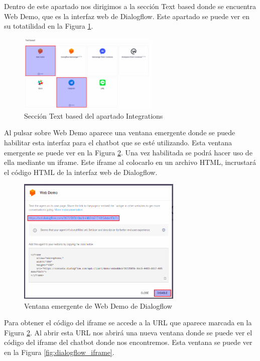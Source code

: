 Dentro de este apartado nos dirigimos a la sección Text based donde se encuentra Web Demo, que es la interfaz web de Dialogflow. Este apartado se puede ver en su totatilidad en la Figura \ref{fig:text_based}.

\begin{figure}[h]
\centering
\includegraphics[width=0.6\textwidth]{imagenes/07_Implementacion/text_based.png}
\caption{Sección Text based del apartado Integrations}
\label{fig:text_based}
\end{figure}

Al pulsar sobre Web Demo aparece una ventana emergente donde se puede habilitar esta interfaz para el chatbot que se esté utilizando. Esta ventana emergente se puede ver en la Figura \ref{fig:web_demo}. Una vez habilitada se podrá hacer uso de ella mediante un iframe. Este iframe al colocarlo en un archivo HTML, incrustará el código HTML de la interfaz web de Dialogflow.

\begin{figure}[h]
\centering
\includegraphics[width=0.7\textwidth]{imagenes/07_Implementacion/web_demo.png}
\caption{Ventana emergente de Web Demo de Dialogflow}
\label{fig:web_demo}
\end{figure}

Para obtener el código del iframe se accede a la URL que aparece marcada en la Figura \ref{fig:web_demo}. Al abrir esta URL nos abrirá una nueva ventana donde se puede ver el código del iframe del chatbot donde nos encontremos. Esta ventana se puede ver en la Figura \ref{fig:dialogflow_iframe}.

